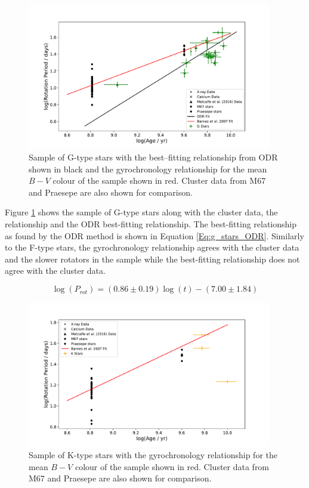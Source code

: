 \begin{figure}[!hbt]
    \centering
    \includegraphics[width=0.95\textwidth]{Figures/5-Activity_rotation/g_prot_v_age.pdf}
    \caption[Rotation period as a function of age for G-type stars]{Sample of G-type stars with the best--fitting relationship from ODR shown in black and the \citet{Barnes_2007} gyrochronology relationship for the mean $B-V$ colour of the sample shown in red. Cluster data from M67 and Praesepe are also shown for comparison.}
    \label{fig:g_prot_v_age}
\end{figure}

Figure \ref{fig:g_prot_v_age} shows the sample of G-type stars along with the cluster data, the \citet{Barnes_2007} relationship and the ODR best-fitting relationship. The best-fitting relationship as found by the ODR method is shown in Equation \ref{Eq:g_stars_ODR}. Similarly to the F-type stars, the gyrochronology relationship agrees with the cluster data and the slower rotators in the sample while the best-fitting relationship does not agree with the cluster data.


\begin{equation}
    \log(P_{rot}) = (0.86 \pm 0.19)\log(t) - (7.00 \pm 1.84)
    \label{Eq:g_stars_ODR}
\end{equation}

\begin{figure}[h!]
    \centering
    \includegraphics[width=0.95\textwidth]{Figures/5-Activity_rotation/k_prot_v_age.pdf}
    \caption[Rotation period as a function of age for K-type stars]{Sample of K-type stars with the \citet{Barnes_2007} gyrochronology relationship for the mean $B-V$ colour of the sample shown in red. Cluster data from M67 and Praesepe are also shown for comparison.}
    \label{fig:k_prot_v_age}
\end{figure}

